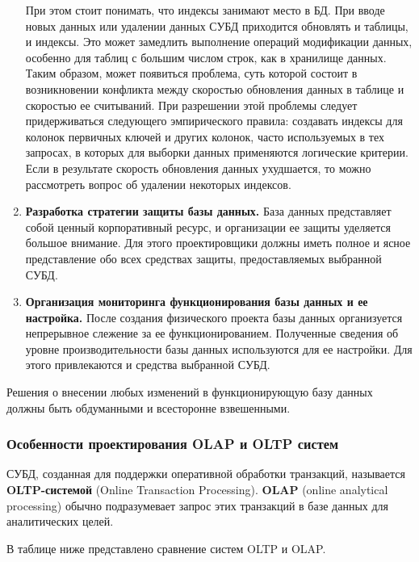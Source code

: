 \begin{enumerate}
	При этом стоит понимать, что индексы занимают место в БД. При вводе новых данных или удалении
	данных СУБД приходится обновлять и таблицы, и индексы. Это может
	замедлить выполнение операций модификации данных, особенно для таблиц
	с большим числом строк, как в хранилище данных. Таким образом, может появиться
	проблема, суть которой состоит в возникновении конфликта между
	скоростью обновления данных в таблице и скоростью ее считываний. При
	разрешении этой проблемы следует придерживаться следующего
	эмпирического правила: создавать индексы для колонок первичных ключей и
	других колонок, часто используемых в тех запросах, в которых для выборки
	данных применяются логические критерии. Если в результате скорость
	обновления данных ухудшается, то можно рассмотреть вопрос об удалении
	некоторых индексов.
        
    \item \textbf{Разработка стратегии защиты базы данных.}
        База данных представляет собой ценный корпоративный ресурс, и организации ее защиты уделяется большое
        внимание. Для этого проектировщики должны иметь полное и ясное представление обо всех средствах защиты,
        предоставляемых выбранной СУБД.

    \item \textbf{Организация мониторинга функционирования базы данных и ее настройка.}
        После создания физического проекта базы данных организуется непрерывное слежение за ее функционированием.
        Полученные сведения об уровне производительности базы данных используются для ее настройки. Для этого
        привлекаются и средства выбранной СУБД.
\end{enumerate}

Решения о внесении любых изменений в функционирующую базу данных должны быть обдуманными и всесторонне взвешенными.

\subsubsection{Особенности проектирования OLAP и OLTP систем}

СУБД, созданная для поддержки оперативной обработки транзакций,
называется \textbf{OLTP-системой} (Online Transaction Processing). \textbf{OLAP} (online analytical processing) обычно подразумевает запрос этих транзакций в базе данных для аналитических целей. 

В таблице ниже представлено сравнение систем OLTP и OLAP\autocite{oracle_OLTP}.

